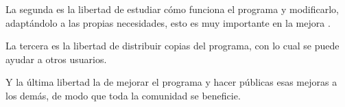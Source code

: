 \documentclass{article}
\begin{document}
La segunda es la libertad de estudiar cómo funciona el programa y modificarlo, adaptándolo a las propias necesidades, esto es muy importante en la mejora .

La tercera es la libertad de distribuir copias del programa, con lo cual se puede ayudar a otros usuarios.

Y la última libertad la de mejorar el programa y hacer públicas esas mejoras a los demás, de modo que toda la comunidad se beneficie.
 
 
 
 
 
 
\end{document}
